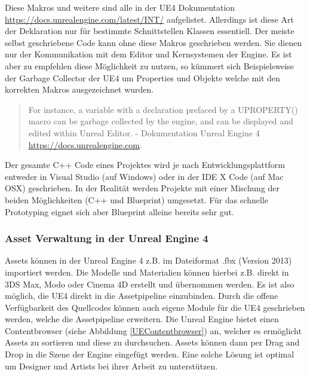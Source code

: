\documentclass[pagesize, paper=a4, fontsize=12pt, titlepage=true, headings=small, headnosepline, abstractoff, liststotoc, nochapterprefix, plainheadsepline, twoside]{scrreprt}
\begin{document}


Diese Makros und weitere sind alle in der UE4 Dokumentation \url{https://docs.unrealengine.com/latest/INT/} aufgelistet. Allerdings ist diese Art der Deklaration nur für bestimmte Schnittstellen Klassen essentiell. Der meiste selbst geschriebene Code kann ohne diese Makros geschrieben werden. Sie dienen nur der Kommunikation mit dem Editor und Kernsystemen der Engine. Es ist aber zu empfehlen diese Möglichkeit zu nutzen, so kümmert sich Beispielsweise der Garbage Collector der UE4 um Properties und Objekte welche mit den korrekten Makros ausgezeichnet wurden. 
\begin{quote}
\glqq For instance, a variable with a declaration prefaced by a UPROPERTY() macro can be garbage collected by the engine, and can be displayed and edited within Unreal Editor.\grqq{} \autocite{UnrealEngine4} - Dokumentation Unreal Engine 4 \url{https://docs.unrealengine.com}.
\end{quote}
Der gesamte C++ Code eines Projektes wird je nach Entwicklungsplattform entweder in Visual Studio (auf Windows) oder in der IDE X Code (auf Mac OSX) geschrieben. In der Realität werden Projekte mit einer Mischung der beiden Möglichkeiten (C++ und Blueprint) umgesetzt. Für das schnelle Prototyping eignet sich aber Blueprint alleine bereits sehr gut.

\subsubsection{Asset Verwaltung in der Unreal Engine 4}
Assets können in der Unreal Engine 4  z.B. im Dateiformat .fbx (Version 2013) importiert werden. Die Modelle und Materialien können hierbei z.B. direkt in 3DS Max, Modo oder Cinema 4D erstellt und übernommen werden. Es ist also möglich, die UE4 direkt in die Assetpipeline einzubinden. Durch die offene Verfügbarkeit des Quellcodes können auch eigene Module für die UE4 geschrieben werden, welche die Assetpipeline erweitern. Die Unreal Engine bietet einen Contentbrowser (siehe Abbildung \ref{UEContentbrowser}) an, welcher es ermöglicht Assets zu sortieren und diese zu durchsuchen. Assets können dann per Drag and Drop in die Szene der Engine eingefügt werden. Eine solche Lösung ist optimal um Designer und Artists bei ihrer Arbeit zu unterstützen.
\end{document}
